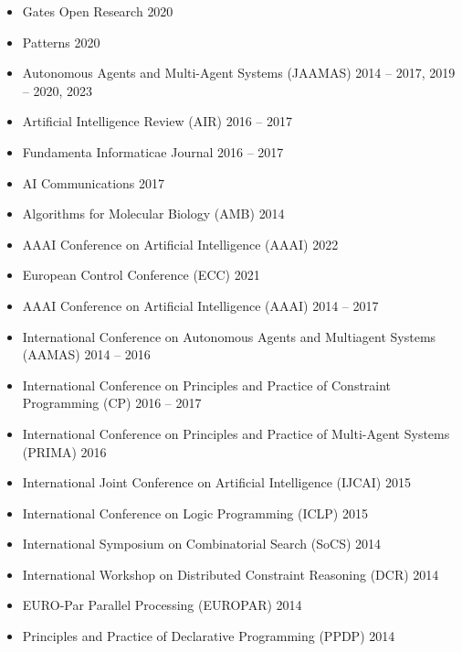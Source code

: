 \begin{itemize}
  \item Gates Open Research \hfill{2020}

  \item Patterns \hfill{2020}

  \item Autonomous Agents and Multi-Agent Systems (JAAMAS) \hfill {2014 -- 2017, 2019 -- 2020, 2023}

  \item Artificial Intelligence Review (AIR) \hfill{2016 -- 2017}
  \item Fundamenta Informaticae Journal \hfill{2016 -- 2017}
  \item AI Communications \hfill{2017}  
  \item Algorithms for Molecular Biology (AMB) \hfill {2014}
\end{itemize}

\begin{itemize}
    \item AAAI Conference on Artificial Intelligence (AAAI) \hfill {2022}
\end{itemize}

\begin{itemize}
  
  \item European Control Conference (ECC) \hfill 2021

  \item AAAI Conference on Artificial Intelligence (AAAI) \hfill {2014 -- 2017}
  
  \item International Conference on Autonomous Agents and Multiagent Systems (AAMAS) \hfill {2014 -- 2016}
    
  \item International Conference on Principles and Practice of Constraint Programming (CP) \hfill{2016 -- 2017} 
  
  \item International Conference on Principles and Practice of Multi-Agent Systems (PRIMA) \hfill{2016}
  
  \item International Joint Conference on Artificial Intelligence (IJCAI) \hfill {2015}
  
  \item International Conference on Logic Programming (ICLP) \hfill {2015}
  
  \item International Symposium on Combinatorial Search (SoCS) \hfill {2014}
  
  \item International Workshop on Distributed Constraint Reasoning (DCR) \hfill 2014
  
  \item EURO-Par Parallel Processing (EUROPAR) \hfill {2014}
  
  \item Principles and Practice of Declarative Programming (PPDP) \hfill {2014}
\end{itemize}

